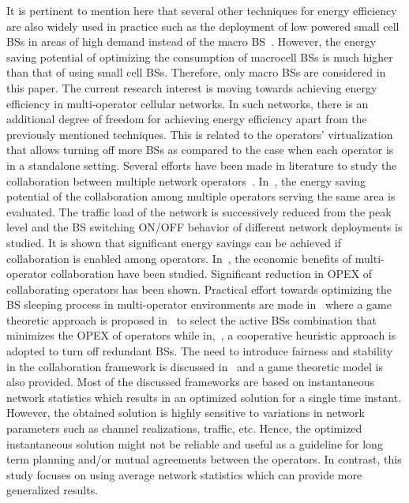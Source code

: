 \documentclass[10pt, letter, twocolumn]{IEEEtran}
\begin{document}
It is pertinent to mention here that several other techniques for energy efficiency are also widely used in practice such as the deployment of low powered small cell BSs in areas of high demand instead of the macro BS~\cite{small_cell_green}. However, the energy saving potential of optimizing the consumption of macrocell BSs is much higher than that of using small cell BSs. Therefore, only macro BSs are considered in this paper. The current research interest is moving towards achieving energy efficiency in multi-operator cellular networks. In such networks, there is an additional degree of freedom for achieving energy efficiency apart from the previously mentioned techniques. This is related to the operators' virtualization that allows turning off more BSs as compared to the case when each operator is in a standalone setting. Several efforts have been made in literature to study the collaboration between multiple network operators~\cite{coop2,coop3,coop4}. In~\cite{coop2}, the energy saving potential of the collaboration among multiple operators serving the same area is evaluated. The traffic load of the network is successively reduced from the peak level and the BS switching ON/OFF behavior of different network deployments is studied. It is shown that significant energy savings can be achieved if collaboration is enabled among operators. In~\cite{coop3}, the economic benefits of multi-operator collaboration have been studied. Significant reduction in OPEX of collaborating operators has been shown. Practical effort towards optimizing the BS sleeping process in multi-operator environments are made in~\cite{coop4,7417231} where a game theoretic approach is proposed in~\cite{coop4} to select the active BSs combination that minimizes the OPEX of operators while in,~\cite{7417231}, a cooperative heuristic approach is adopted to turn off redundant BSs. The need to introduce fairness and stability in the collaboration framework is discussed in~\cite{6347622} and a game theoretic model is also provided. Most of the discussed frameworks are based on instantaneous network statistics which results in an optimized solution for a single time instant. However, the obtained solution is highly sensitive to variations in network parameters such as channel realizations, traffic, etc. Hence, the optimized instantaneous solution might not be reliable and useful as a guideline for long term planning and/or mutual agreements between the operators. In contrast, this study focuses on using average network statistics which can provide more generalized results.
\end{document}
